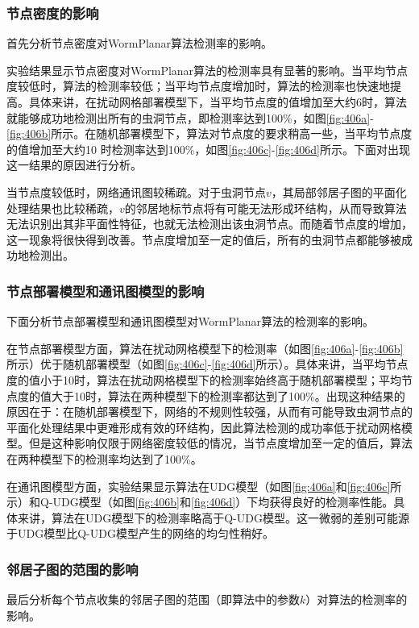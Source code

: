 \subsubsection{节点密度的影响}
首先分析节点密度对WormPlanar算法检测率的影响。

实验结果显示节点密度对WormPlanar算法的检测率具有显著的影响。当平均节点度较低时，算法的检测率较低；当平均节点度增加时，算法的检测率也快速地提高。具体来讲，在扰动网格部署模型下，当平均节点度的值增加至大约6时，算法就能够成功地检测出所有的虫洞节点，即检测率达到100\%，如图\ref{fig:406a}-\ref{fig:406b}所示。在随机部署模型下，算法对节点度的要求稍高一些，当平均节点度的值增加至大约10 时检测率达到100\%，如图\ref{fig:406c}-\ref{fig:406d}所示。下面对出现这一结果的原因进行分析。

当节点度较低时，网络通讯图较稀疏。对于虫洞节点$v$，其局部邻居子图的平面化处理结果也比较稀疏，$v$的邻居地标节点将有可能无法形成环结构，从而导致算法无法识别出其非平面性特征，也就无法检测出该虫洞节点。而随着节点度的增加，这一现象将很快得到改善。节点度增加至一定的值后，所有的虫洞节点都能够被成功地检测出。
\subsubsection{节点部署模型和通讯图模型的影响}
下面分析节点部署模型和通讯图模型对WormPlanar算法的检测率的影响。

在节点部署模型方面，算法在扰动网格模型下的检测率（如图\ref{fig:406a}-\ref{fig:406b}所示）优于随机部署模型（如图\ref{fig:406c}-\ref{fig:406d}所示）。具体来讲，当平均节点度的值小于10时，算法在扰动网格模型下的检测率始终高于随机部署模型；平均节点度的值大于10时，算法在两种模型下的检测率都达到了100\%。出现这种结果的原因在于：在随机部署模型下，网络的不规则性较强，从而有可能导致虫洞节点的平面化处理结果中更难形成有效的环结构，因此算法检测的成功率低于扰动网格模型。但是这种影响仅限于网络密度较低的情况，当节点度增加至一定的值后，算法在两种模型下的检测率均达到了100\%。

在通讯图模型方面，实验结果显示算法在UDG模型（如图\ref{fig:406a}和\ref{fig:406c}所示）和Q-UDG模型（如图\ref{fig:406b}和\ref{fig:406d}）下均获得良好的检测率性能。具体来讲，算法在UDG模型下的检测率略高于Q-UDG模型。这一微弱的差别可能源于UDG模型比Q-UDG模型产生的网络的均匀性稍好。
\subsubsection{邻居子图的范围的影响}
最后分析每个节点收集的邻居子图的范围（即算法中的参数$k$）对算法的检测率的影响。

